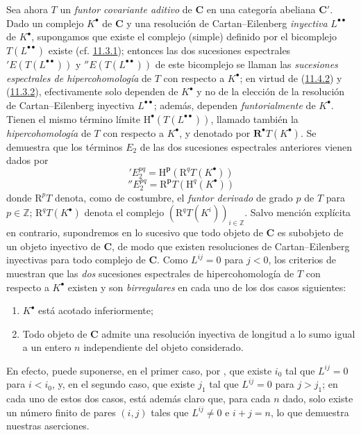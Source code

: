 \begin{env}[11.4.3]
\label{0.11.4.3}
\label{0.11.4.3-fr}
Sea ahora $T$ un \emph{funtor covariante aditivo} de $\boldsymbol{C}$ en una categoría abeliana $\boldsymbol{C}'$.
Dado un complejo $K^\bullet$ de $\boldsymbol{C}$ y una resolución de Cartan--Eilenberg \emph{inyectiva} $L^{\bullet\bullet}$ de $K^\bullet$, supongamos que existe el complejo (simple) definido por el bicomplejo $T(L^{\bullet\bullet})$ existe
(cf. \hyperref[0.11.3.1-fr]{11.3.1}); entonces las dos sucesiones espectrales
$'E(T(L^{\bullet\bullet}))$ y $''E(T(L^{\bullet\bullet}))$ de este bicomplejo se llaman las \emph{sucesiones espectrales de hipercohomología} de $T$ con respecto a $K^\bullet$; en virtud de (\hyperref[0.11.4.2-fr]{11.4.2}) y (\hyperref[0.11.3.2-fr]{11.3.2}), efectivamente solo dependen de $K^\bullet$ y no de la elección de la resolución de Cartan--Eilenberg inyectiva $L^{\bullet\bullet}$;
además, dependen \emph{funtorialmente} de $K^\bullet$.
Tienen el mismo término límite $\mathrm H^\bullet(T(L^{\bullet\bullet}))$, llamado también la \emph{hipercohomología} de $T$ con respecto a $K^\bullet$, y denotado por $\mathbf R^\bullet T(K^\bullet)$.
Se demuestra que los términos $E_2$ de las dos sucesiones espectrales anteriores vienen dados por
\[
  \label{0.11.4.3.1-fr}
  'E_2^{pq}=\mathrm H^{\boldsymbol{p}}(\mathrm R^qT(K^\bullet))
  \tag{11.4.3.1}
\]
\[
  \label{0.11.4.3.2-fr}
  ''E_2^{pq}=\mathrm R^{\boldsymbol{p}}T(\mathrm H^q(K^\bullet))
  \tag{11.4.3.2}
\]
donde $\mathrm R^pT$ denota, como de costumbre, el \emph{funtor derivado} de grado $p$ de $T$ para $p\in\mathbb Z$;
$\mathrm R^qT(K^\bullet)$ denota el complejo $(\mathrm R^qT(K^i))_{i\in\mathbb Z}$.
\label{0.11.4.4}
\label{0.11.4.4-fr}
Salvo mención explícita en contrario, supondremos en lo sucesivo que todo objeto de $\boldsymbol{C}$ es subobjeto de un objeto inyectivo de $\boldsymbol{C}$, de modo que existen resoluciones de Cartan--Eilenberg inyectivas para todo complejo de $\boldsymbol{C}$.
Como $L^{ij}=0$ para $j<0$, los criterios de  muestran que las \emph{dos} sucesiones espectrales de hipercohomología de $T$ con respecto a $K^\bullet$ existen y
son \emph{birregulares} en cada uno de los dos casos siguientes:
\begin{enumerate}
  \item[$1^\circ$] $K^\bullet$ está acotado inferiormente;
  \item[$2^\circ$] Todo objeto de $\boldsymbol{C}$ admite una resolución inyectiva
de longitud a lo sumo igual a un entero $n$ independiente del objeto considerado.
\end{enumerate}
En efecto, puede suponerse, en el primer caso, por , que existe $i_0$ tal que $L^{ij}=0$ para $i<i_0$, y, en el segundo caso, que existe $j_1$ tal que $L^{ij}=0$ para $j>j_1$;
en cada uno de estos dos casos, está además claro que, para cada $n$ dado, solo existe un número finito de pares $(i,j)$ tales que $L^{ij}\neq0$ e $i+j=n$, lo que demuestra nuestras aserciones.


\end{env}
